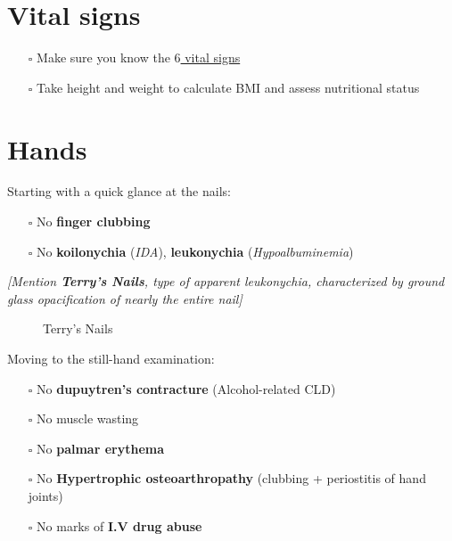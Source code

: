 \documentclass[
  13.5pt,
  a4paper,
  DIV=11,
  numbers=noendperiod]{scrreprt}
\makeatletter
\newcommand*\pandocbounded[1]{%
  \sbox\pandoc@box{#1}%
  \Gscale@div\@tempa{\textheight}{\dimexpr\ht\pandoc@box+\dp\pandoc@box\relax}%
  \Gscale@div\@tempb{\linewidth}{\wd\pandoc@box}%
  \ifdim\@tempb\p@<\@tempa\p@\let\@tempa\@tempb\fi%
  \ifdim\@tempa\p@<\p@\scalebox{\@tempa}{\usebox\pandoc@box}%
  \else\usebox{\pandoc@box}%
  \fi%
}
\providecommand{\tightlist}{%
  \setlength{\itemsep}{0pt}\setlength{\parskip}{0pt}}
\makeatother
\begin{document}
\section{Vital signs}\label{vital-signs-3}

\begin{itemize}
\tightlist
\item[$\square$]
  Make sure you know the \href{miscellaneous.qmd}{\(6\) vital signs}
\item[$\square$]
  Take height and weight to calculate BMI and assess nutritional status
\end{itemize}

\section{Hands}\label{hands-1}

Starting with a quick glance at the nails:

\begin{itemize}
\tightlist
\item[$\square$]
  No \textbf{finger clubbing}
\item[$\square$]
  No \textbf{koilonychia} (\emph{IDA}), \textbf{leukonychia}
  (\emph{Hypoalbuminemia})
\end{itemize}

\emph{{[}Mention \textbf{Terry's Nails}, type of apparent leukonychia,
characterized by ground glass opacification of nearly the entire
nail{]}}

\begin{figure}[H]

{\centering \pandocbounded{\texttt{[image: cld2.png]}}

}

\caption{Terry's Nails}

\end{figure}%

Moving to the still-hand examination:

\begin{itemize}
\tightlist
\item[$\square$]
  No \textbf{dupuytren's contracture} (Alcohol-related CLD)
\item[$\square$]
  No muscle wasting
\item[$\square$]
  No \textbf{palmar erythema}
\item[$\square$]
  No \textbf{Hypertrophic osteoarthropathy} (clubbing + periostitis of
  hand joints)
\item[$\square$]
  No marks of \textbf{I.V drug abuse}
\end{itemize}
\end{document}
